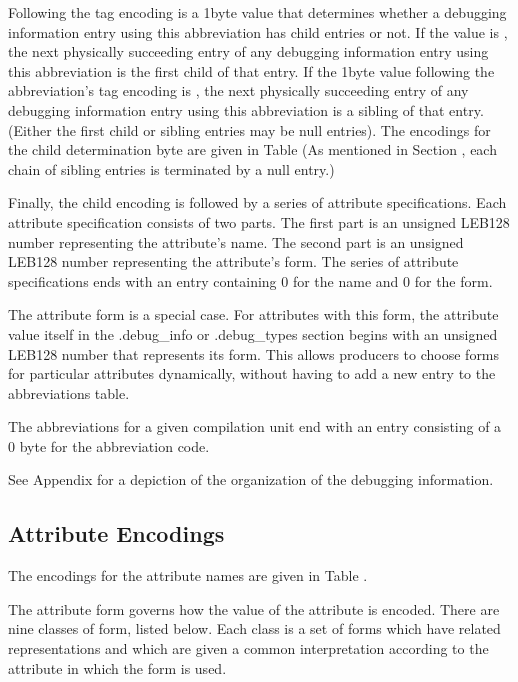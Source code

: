 Following the tag encoding is a 1\dash byte value that determines
whether a debugging information entry using this abbreviation
has child entries or not. If the value is 
,
the next physically succeeding entry of any debugging
information entry using this abbreviation is the first
child of that entry. If the 1\dash byte value following the
abbreviation’s tag encoding is 
, the next
physically succeeding entry of any debugging information entry
using this abbreviation is a sibling of that entry. (Either
the first child or sibling entries may be null entries). The
encodings for the child determination byte are given in 
Table 
(As mentioned in 
Section , 
each chain of
sibling entries is terminated by a null entry.)

Finally, the child encoding is followed by a series of
attribute specifications. Each attribute specification
consists of two parts. The first part is an unsigned LEB128
number representing the attribute’s name. The second part
is an unsigned LEB128 number representing the attribute’s
form. The series of attribute specifications ends with an
entry containing 0 for the name and 0 for the form.

The attribute form 
 is a special case. For
attributes with this form, the attribute value itself in the
.debug\_info or .debug\_types section begins with an unsigned
LEB128 number that represents its form. This allows producers
to choose forms for particular attributes dynamically,
without having to add a new entry to the abbreviations table.

The abbreviations for a given compilation unit end with an
entry consisting of a 0 byte for the abbreviation code.

See 
Appendix  
for a depiction of the organization of the
debugging information.

\subsection{Attribute Encodings}
\label{datarep:attributeencodings}

The encodings for the attribute names are given in 
Table .

The attribute form governs how the value of the attribute is
encoded. There are nine classes of form, listed below. Each
class is a set of forms which have related representations
and which are given a common interpretation according to the
attribute in which the form is used.

